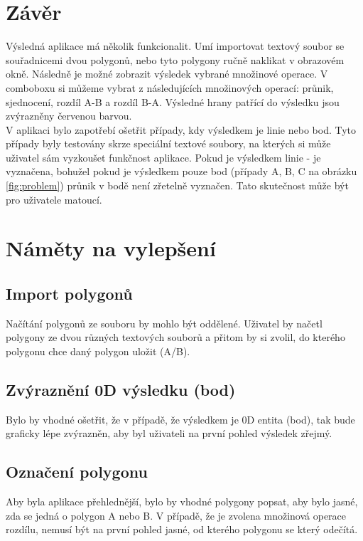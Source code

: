 \documentclass[a4paper,11pt,twoside]{article}
\begin{document}
\newpage
{}

\vspace*{-1cm}
\section{Závěr}
\noindent
\large
Výsledná aplikace má několik funkcionalit. Umí importovat textový soubor se souřadnicemi dvou polygonů, nebo tyto polygony ručně naklikat v obrazovém okně. Následně je možné zobrazit výsledek vybrané množinové operace. V comboboxu si můžeme vybrat z následujících množinových operací: průnik, sjednocení, rozdíl A-B a rozdíl B-A. Výsledné hrany patřící do výsledku jsou zvýrazněny červenou barvou. \\
V aplikaci bylo zapotřebí ošetřit případy, kdy výsledkem je linie nebo bod. Tyto případy byly testovány skrze speciální textové soubory, na kterých si může uživatel sám vyzkoušet funkčnost aplikace. Pokud je výsledkem linie - je vyznačena, bohužel pokud je výsledkem pouze bod (případy A, B, C na obrázku \ref{fig:problem}) průnik v bodě není zřetelně vyznačen. Tato skutečnost může být pro uživatele matoucí. 

\section{Náměty na vylepšení}

\subsection{Import polygonů}
Načítání polygonů ze souboru by mohlo být oddělené. Uživatel by načetl polygony ze dvou různých textových souborů a přitom by si zvolil, do kterého polygonu chce daný polygon uložit (A/B).

\subsection{Zvýraznění 0D výsledku (bod)}
Bylo by vhodné ošetřit, že v případě, že výsledkem je 0D entita (bod), tak bude graficky lépe zvýrazněn, aby byl uživateli na první pohled výsledek zřejmý.

\subsection{Označení polygonu}
Aby byla aplikace přehlednější, bylo by vhodné polygony popsat, aby bylo jasné, zda se jedná o polygon A nebo B. V případě, že je zvolena množinová operace rozdílu, nemusí být na první pohled jasné, od kterého polygonu se který odečítá.


\newpage
\vspace*{-6ex}
\renewcommand{\refname}{Literatura} 
    
    
 
\end{document}
